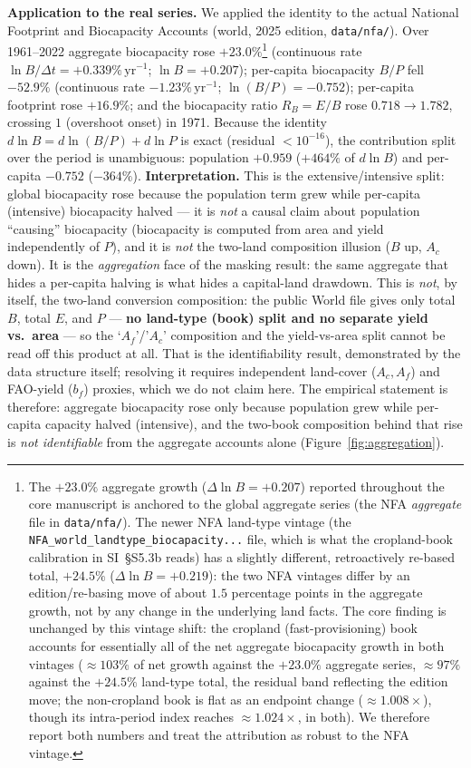 \documentclass[11pt]{article}
\begin{document}
\noindent\textbf{Application to the real series.} We applied the identity to the actual National Footprint and Biocapacity Accounts (world, 2025 edition, \texttt{data/nfa/}). Over 1961--2022 aggregate biocapacity rose $+23.0\%$\footnote{The $+23.0\%$ aggregate growth ($\Delta\ln B=+0.207$) reported throughout the core manuscript is anchored to the global aggregate series (the NFA \emph{aggregate} file in \texttt{data/nfa/}). The newer NFA land-type vintage (the \texttt{NFA\_world\_landtype\_biocapacity...} file, which is what the cropland-book calibration in SI~§S5.3b reads) has a slightly different, retroactively re-based total, $+24.5\%$ ($\Delta\ln B=+0.219$): the two NFA vintages differ by an edition/re-basing move of about $1.5$ percentage points in the aggregate growth, not by any change in the underlying land facts. The core finding is unchanged by this vintage shift: the cropland (fast-provisioning) book accounts for essentially all of the net aggregate biocapacity growth in both vintages ($\approx103\%$ of net growth against the $+23.0\%$ aggregate series, $\approx97\%$ against the $+24.5\%$ land-type total, the residual band reflecting the edition move; the non-cropland book is flat as an endpoint change ($\approx1.008\times$), though its intra-period index reaches $\approx1.024\times$, in both). We therefore report both numbers and treat the attribution as robust to the NFA vintage.} (continuous rate $\ln B/\Delta t=+0.339\%\,\text{yr}^{-1}$; $\ln B=+0.207$); per-capita biocapacity $B/P$ fell $-52.9\%$ (continuous rate $-1.23\%\,\text{yr}^{-1}$; $\ln(B/P)=-0.752$); per-capita footprint rose $+16.9\%$; and the biocapacity ratio $R_B=E/B$ rose $0.718\to1.782$, crossing $1$ (overshoot onset) in 1971. Because the identity $d\ln B=d\ln(B/P)+d\ln P$ is exact (residual $<10^{-16}$), the contribution split over the period is unambiguous: population $+0.959$ ($+464\%$ of $d\ln B$) and per-capita $-0.752$ ($-364\%$). \textbf{Interpretation.} This is the extensive/intensive split: global biocapacity rose because the population term grew while per-capita (intensive) biocapacity halved --- it is \emph{not} a causal claim about population ``causing'' biocapacity (biocapacity is computed from area and yield independently of $P$), and it is \emph{not} the two-land composition illusion ($B$ up, $A_c$ down). It is the \emph{aggregation} face of the masking result: the same aggregate that hides a per-capita halving is what hides a capital-land drawdown. This is \emph{not}, by itself, the two-land conversion composition: the public World file gives only total $B$, total $E$, and $P$ --- \textbf{no land-type (book) split and no separate yield vs.\ area} --- so the `$A_f$'/'$A_c$' composition and the yield-vs-area split cannot be read off this product at all. That is the identifiability result, demonstrated by the data structure itself; resolving it requires independent land-cover ($A_c,A_f$) and FAO-yield ($b_f$) proxies, which we do not claim here. The empirical statement is therefore: aggregate biocapacity rose only because population grew while per-capita capacity halved (intensive), and the two-book composition behind that rise is \emph{not identifiable} from the aggregate accounts alone (Figure~\ref{fig:aggregation}).
\end{document}
